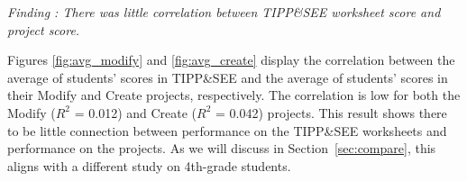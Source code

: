 \documentclass[sigconf,manuscript,review,anonymous]{acmart} %
\def\ts{TIPP\&SEE}
\begin{document}
\textit{Finding : There was little correlation between \ts{} worksheet score and project score.}

Figures \ref{fig:avg_modify} and \ref{fig:avg_create} display the correlation between the average of students' scores in \ts{} and the average of students' scores in their Modify and Create projects, respectively. The correlation is low for both the Modify ($R^2$ = 0.012) and Create ($R^2$ = 0.042) projects. %
This result shows there to be little connection between performance on the \ts{}  worksheets and performance on the projects. As we will discuss in Section~\ref{sec:compare}, this aligns with a different study on 4th-grade students.
\end{document}
